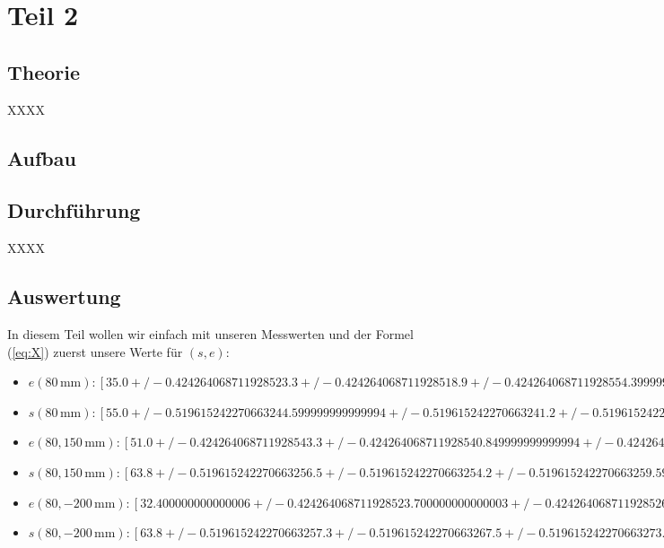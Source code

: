 \documentclass[11pt,a4paper]{article}
\newcommand{\halftime}[4]{\begin{figure}[h]
\begin{minipage}{.#1\textwidth}#3\end{minipage}\begin{minipage}{.#2\textwidth}
\centering
#4\end{minipage}
\end{figure}}
\begin{document}
\section{Teil 2}

\subsection{Theorie}

XXXX

\subsection{Aufbau}



\subsection{Durchführung}

XXXX

\subsection{Auswertung}

In diesem Teil wollen wir einfach mit unseren Messwerten und der Formel (\ref{eq:X}) zuerst unsere Werte f\"ur $(s,e)$:
\begin{itemize}
\item $e(80\,\mathrm{mm}):  [35.0+/-0.4242640687119285 23.3+/-0.4242640687119285
 18.9+/-0.4242640687119285 54.39999999999999+/-0.4242640687119285
 44.50000000000001+/-0.4242640687119285]$
\item $s(80\,\mathrm{mm}):  [55.0+/-0.5196152422706632 44.599999999999994+/-0.5196152422706632
 41.2+/-0.5196152422706632 73.2+/-0.5196152422706632
 63.8+/-0.5196152422706632]$
\item $e(80,150\,\mathrm{mm}):  [51.0+/-0.4242640687119285 43.3+/-0.4242640687119285
 40.849999999999994+/-0.4242640687119285 46.6+/-0.4242640687119285
 54.3+/-0.4242640687119285]$
\item $s(80,150\,\mathrm{mm}):  [63.8+/-0.5196152422706632 56.5+/-0.5196152422706632
 54.2+/-0.5196152422706632 59.599999999999994+/-0.5196152422706632
 67.1+/-0.5196152422706632]$
\item $e(80,-200\,\mathrm{mm}):  [32.400000000000006+/-0.4242640687119285
 23.700000000000003+/-0.4242640687119285
 26.799999999999997+/-0.4242640687119285
 43.49999999999999+/-0.4242640687119285 22.5+/-0.4242640687119285]$
\item $s(80,-200\,\mathrm{mm}):  [63.8+/-0.5196152422706632 57.3+/-0.5196152422706632
 67.5+/-0.5196152422706632 73.3+/-0.5196152422706632
 56.3+/-0.5196152422706632]$
\end{itemize}
\end{document}
